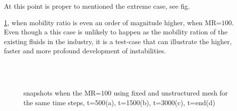 \documentclass[preprint,authoryear,12pt]{elsarticle}
\begin{document}
At this point is proper to mentioned the extreme case, see fig.{\ref{fig:4testcase}, when mobility ratio is even an order of magnitude higher, when MR=$100$. Even though a this case is unlikely to happen as the mobility ration of the existing fluids in the industry, it is a test-case that can illustrate the higher, faster and more profound development of instabilities.   

\begin{figure}[h]
\centering
{}%
%
\\ 
\\
\caption{snapshots when the MR=$100$ using fixed and unstructured mesh for the same time steps, t=500(a), t=1500(b), t=3000(c), t=end(d) }
\label{fig:4testcase}
\end{figure}



}
\end{document}
